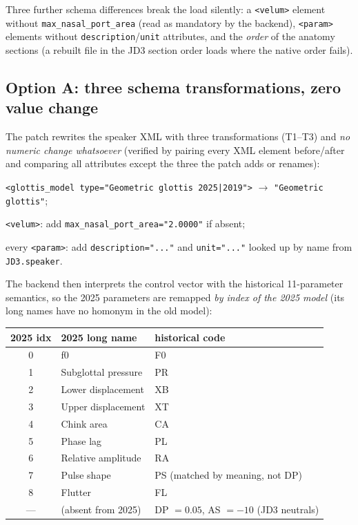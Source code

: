 \documentclass[11pt,a4paper]{article}
\newcommand{\speakerfile}[1]{\texttt{#1.speaker}}
\newcommand{\code}[1]{\texttt{#1}}
\begin{document}
Three further schema differences break the load silently: a
\code{<velum>} element without \code{max\_nasal\_port\_area} (read as
mandatory by the backend), \code{<param>} elements without
\code{description}/\code{unit} attributes, and the \emph{order} of
the anatomy sections (a rebuilt file in the JD3 section order loads
where the native order fails).

\subsection{Option A: three schema transformations, zero value change}

The patch rewrites the speaker XML with three transformations
(T1--T3) and \emph{no numeric change whatsoever} (verified by pairing
every XML element before/after and comparing all attributes except
the three the patch adds or renames):

\begin{description}[leftmargin=2em]
\item[T1] \code{<glottis\_model type="Geometric glottis 2025|2019">}
  $\to$ \code{"Geometric glottis"};
\item[T2] \code{<velum>}: add \code{max\_nasal\_port\_area="2.0000"}
  if absent;
\item[T3] every \code{<param>}: add \code{description="..."} and
  \code{unit="..."} looked up by name from \speakerfile{JD3}.
\end{description}

The backend then interprets the control vector with the historical
11-parameter semantics, so the 2025 parameters are remapped
\emph{by index of the 2025 model} (its long names have no homonym in
the old model):

\begin{center}
\small
\begin{tabular}{@{}cll@{}}
\toprule
\textbf{2025 idx} & \textbf{2025 long name} & \textbf{historical code} \\
\midrule
0 & f0 & F0 \\
1 & Subglottal pressure & PR \\
2 & Lower displacement & XB \\
3 & Upper displacement & XT \\
4 & Chink area & CA \\
5 & Phase lag & PL \\
6 & Relative amplitude & RA \\
7 & Pulse shape & PS (matched by meaning, not DP) \\
8 & Flutter & FL \\
--- & (absent from 2025) & DP $= 0.05$, AS $= -10$ (JD3 neutrals) \\
\bottomrule
\end{tabular}
\end{center}
\end{document}
